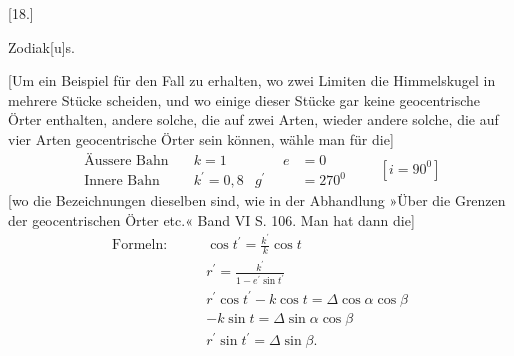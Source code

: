 \begin{center}
[18.]

Zodiak[u]s.
\end{center}

[Um ein Beispiel für den Fall zu erhalten, wo zwei Limiten die Himmelskugel in mehrere Stücke scheiden, und wo einige dieser Stücke gar keine geocentrische Örter enthalten, andere solche, die auf zwei Arten, wieder andere solche, die auf vier Arten geocentrische Örter sein können, wähle man für die]
\[
\begin{aligned}
\text{Äussere Bahn}\quad &k=1&\qquad e&=0\\
\text{Innere Bahn}\quad &k^{\prime}=0{,}8&g^{\prime}&=270^{0}
\end{aligned}
\qquad [i=90^{0}]
\]
[wo die Bezeichnungen dieselben sind, wie in der Abhandlung »Über die Grenzen der geocentrischen Örter etc.« Band VI S. 106. Man hat dann die]
\[
\begin{aligned}
\text{Formeln:}\qquad &\cos t^{\prime}=\frac{k^{\prime}}{k}\cos t\\[5pt]
&r^{\prime}=\frac{k^{\prime}}{1-e^{\prime}\sin t^{\prime}}\\[5pt]
&r^{\prime}\cos t^{\prime}-k\cos t=\Delta\cos\alpha\cos\beta\\[5pt]
&-k\sin t=\Delta\sin\alpha\cos\beta\\[5pt]
&r^{\prime}\sin t^{\prime}=\Delta\sin\beta.
\end{aligned}
\]

